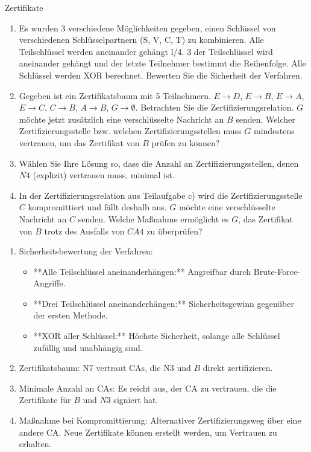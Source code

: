 \documentclass{article}
\begin{document}
\begin{exercise}{Zertifikate}
  \begin{enumerate}
    \item Es wurden 3 verschiedene Möglichkeiten gegeben, einen Schlüssel von verschiedenen Schlüsselpartnern (S, V, C, T) zu kombinieren. Alle Teilschlüssel werden aneinander gehängt l/4. 3 der Teilschlüssel wird aneinander gehängt und der letzte Teilnehmer bestimmt die Reihenfolge. Alle Schlüssel werden XOR berechnet. Bewerten Sie die Sicherheit der Verfahren.
    \item Gegeben ist ein Zertifikatsbaum mit 5 Teilnehmern. $E \rightarrow D$, $E \rightarrow B$, $E \rightarrow A$, $E \rightarrow C$, $C \rightarrow B$, $A \rightarrow B$, $G \rightarrow \emptyset$. Betrachten Sie die Zertifizierungsrelation. $G$ möchte jetzt zusätzlich eine verschlüsselte Nachricht an $B$ senden. Welcher Zertifizierungsstelle bzw. welchen Zertifizierungsstellen muss $G$ mindestens vertrauen, um das Zertifikat von $B$ prüfen zu können?
    \item Wählen Sie Ihre Lösung so, dass die Anzahl an Zertifizierungsstellen, denen $N4$ (explizit) vertrauen muss, minimal ist.
    \item In der Zertifizierungsrelation aus Teilaufgabe c) wird die Zertifizierungsstelle $C$ kompromittiert und fällt deshalb aus. $G$ möchte eine verschlüsselte Nachricht an $C$ senden. Welche Maßnahme ermöglicht es $G$, das Zertifikat von $B$ trotz des Ausfalls von $CA4$ zu überprüfen?
  \end{enumerate}

  \begin{solution}
    \begin{enumerate}
        \item Sicherheitsbewertung der Verfahren:
        \begin{itemize}
            \item **Alle Teilschlüssel aneinanderhängen:** Angreifbar durch Brute-Force-Angriffe.
            \item **Drei Teilschlüssel aneinanderhängen:** Sicherheitsgewinn gegenüber der ersten Methode.
            \item **XOR aller Schlüssel:** Höchste Sicherheit, solange alle Schlüssel zufällig und unabhängig sind.
        \end{itemize}
        \item Zertifikatsbaum: N7 vertraut CAs, die N3 und $ B $ direkt zertifizieren.
        \item Minimale Anzahl an CAs: Es reicht aus, der CA zu vertrauen, die die Zertifikate für $ B $ und $ N3 $ signiert hat.
        \item Maßnahme bei Kompromittierung: Alternativer Zertifizierungsweg über eine andere CA. Neue Zertifikate können erstellt werden, um Vertrauen zu erhalten.
    \end{enumerate}
  \end{solution}
\end{exercise}
\end{document}
